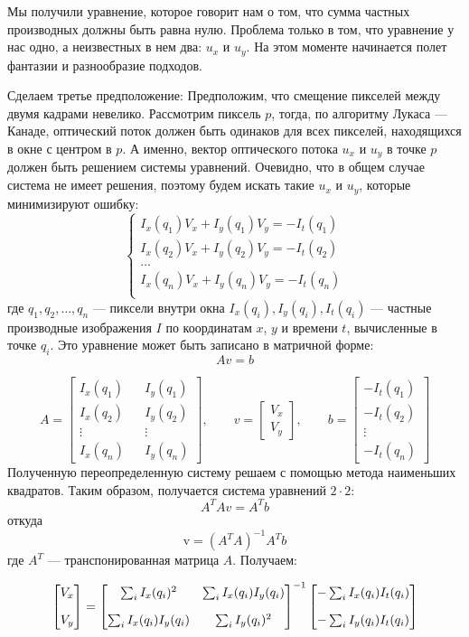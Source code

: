 Мы получили уравнение, которое говорит нам о том, что сумма частных производных должны быть равна нулю. Проблема только в том, что уравнение у нас одно, а неизвестных в нем два: $u_x$ и $u_y$. На этом моменте начинается полет фантазии и разнообразие подходов.

Сделаем третье предположение: Предположим, что смещение пикселей между двумя кадрами невелико. Рассмотрим пиксель $p$, тогда, по алгоритму Лукаса — Канаде, оптический поток должен быть одинаков для всех пикселей, находящихся в окне с центром в $p$. А именно, вектор оптического потока $u_x$ и $u_y$ в точке $p$ должен быть решением системы уравнений. Очевидно, что в общем случае система не имеет решения, поэтому будем искать такие $u_x$ и $u_y$, которые минимизируют ошибку:
$$
\begin{cases}
I_x(q_1) V_x + I_y (q_1) V_y = -I_t(q_1)\\
I_x(q_2) V_x + I_y (q_2) V_y = -I_t(q_2)\\
...\\
I_x(q_n) V_x + I_y (q_n) V_y = -I_t(q_n)\\
\end{cases}
$$
где $q_1,q_2,\dots,q_n$ — пиксели внутри окна
$I_x(q_i),I_y(q_i),I_t(q_i)$ — частные производные изображения $I$ по координатам $x$, $y$ и времени $t$, вычисленные в точке $q_i$.
Это уравнение может быть записано в матричной форме:
$$A v = b$$

$$A = \begin{bmatrix}
I_x(q_1) && I_y(q_1) \\
I_x(q_2) && I_y(q_2) \\
\vdots && \vdots \\
I_x(q_n) && I_y(q_n)
\end{bmatrix},
\quad\quad
v =
\begin{bmatrix}
V_x\\
V_y
\end{bmatrix},
\quad\quad
b =
\begin{bmatrix}
-I_t(q_1)\\
-I_t(q_2)\\
\vdots \\
-I_t(q_n)
\end{bmatrix} $$
Полученную переопределенную систему решаем с помощью метода наименьших квадратов. Таким образом, получается система уравнений $2 \cdot 2$:
$$A^T A v=A^T b$$
откуда
$$\mathrm{v}=(A^T A)^{-1}A^T b$$
где $A^T$ — транспонированная матрица $A$. Получаем:

\begin{equation}
\numberwithin{equation}{section}
\label{eq:lucas}
\begin{bmatrix} V_x\\[10pt] V_y \end{bmatrix} = \begin{bmatrix} \sum_i I_x(q_i)^2 & \sum_i I_x(q_i)I_y(q_i) \\[10pt] \sum_i I_x(q_i)I_y(q_i) & \sum_i I_y(q_i)^2 \end{bmatrix}^{-1} \begin{bmatrix} -\sum_i I_x(q_i)I_t(q_i) \\[10pt] -\sum_i I_y(q_i)I_t(q_i) \end{bmatrix}
\end{equation}

